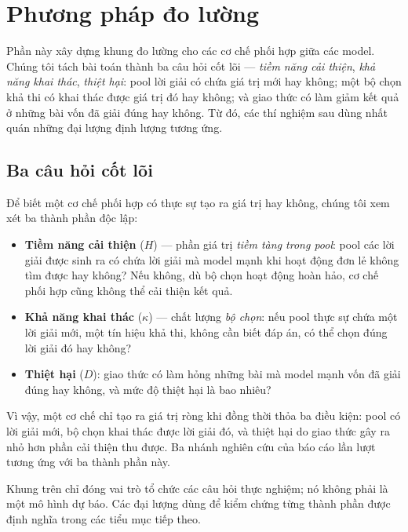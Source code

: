 \section{Phương pháp đo lường}\label{sec:framework}

Phần này xây dựng khung đo lường cho các cơ chế phối hợp giữa các model. Chúng tôi tách bài
toán thành ba câu hỏi cốt lõi --- \emph{tiềm năng cải thiện}, \emph{khả năng khai thác},
\emph{thiệt hại}: pool lời giải có chứa giá trị mới hay không; một bộ chọn khả thi có khai
thác được giá trị đó hay không; và giao thức có làm giảm kết quả ở những bài vốn đã giải đúng
hay không. Từ đó, các thí nghiệm sau dùng nhất quán những đại lượng định lượng tương ứng.

\subsection{Ba câu hỏi cốt lõi}\label{sec:threeq}

Để biết một cơ chế phối hợp có thực sự tạo ra giá trị hay không, chúng tôi xem xét ba thành
phần độc lập:

\begin{itemize}\itemsep1pt
\item \textbf{Tiềm năng cải thiện} ($H$) --- phần giá trị \emph{tiềm tàng trong pool}: pool các lời giải được
      sinh ra có chứa lời giải mà model mạnh khi hoạt động đơn lẻ không tìm được hay không?
      Nếu không, dù bộ chọn hoạt động hoàn hảo, cơ chế phối hợp cũng không thể cải thiện kết
      quả.
\item \textbf{Khả năng khai thác} ($\kappa$) --- chất lượng \emph{bộ chọn}: nếu pool thực sự
      chứa một lời giải mới, một tín hiệu khả thi, không cần biết đáp án, có thể chọn đúng lời
      giải đó hay không?
\item \textbf{Thiệt hại} ($D$): giao thức có làm hỏng những bài mà model mạnh vốn đã giải
      đúng hay không, và mức độ thiệt hại là bao nhiêu?
\end{itemize}

Vì vậy, một cơ chế chỉ tạo ra giá trị ròng khi đồng thời thỏa ba điều kiện: pool có lời giải
mới, bộ chọn khai thác được lời giải đó, và thiệt hại do giao thức gây ra nhỏ hơn phần cải
thiện thu được. Ba nhánh nghiên cứu của báo cáo lần lượt tương ứng với ba thành phần này.

Khung trên chỉ đóng vai trò tổ chức các câu hỏi thực nghiệm; nó không phải là một mô hình dự
báo. Các đại lượng dùng để kiểm chứng từng thành phần được định nghĩa trong các tiểu mục tiếp
theo.


